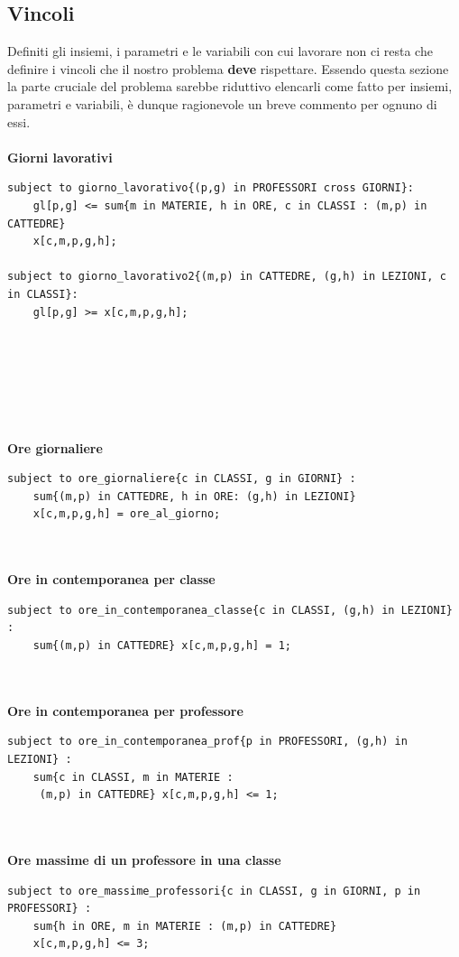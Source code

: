 \documentclass{article}
\begin{document}
\subsection{Vincoli}
Definiti gli insiemi, i parametri e le variabili con cui lavorare non ci resta che definire i vincoli che il nostro problema \textbf{deve} rispettare. Essendo questa sezione la parte cruciale del problema sarebbe riduttivo elencarli come fatto per insiemi, parametri e variabili, è dunque ragionevole un breve commento per ognuno di essi.
\\\\\textbf{Giorni lavorativi}
\begin{verbatim}
subject to giorno_lavorativo{(p,g) in PROFESSORI cross GIORNI}:
	gl[p,g] <= sum{m in MATERIE, h in ORE, c in CLASSI : (m,p) in CATTEDRE}
	x[c,m,p,g,h];

subject to giorno_lavorativo2{(m,p) in CATTEDRE, (g,h) in LEZIONI, c in CLASSI}:
	gl[p,g] >= x[c,m,p,g,h]; 
\end{verbatim}
\\\\\\\\\\\\\textbf{Ore giornaliere}
\begin{verbatim}
subject to ore_giornaliere{c in CLASSI, g in GIORNI} : 
	sum{(m,p) in CATTEDRE, h in ORE: (g,h) in LEZIONI}
	x[c,m,p,g,h] = ore_al_giorno;
\end{verbatim}
\\\\\textbf{Ore in contemporanea per classe}
\begin{verbatim}
subject to ore_in_contemporanea_classe{c in CLASSI, (g,h) in LEZIONI} :
	sum{(m,p) in CATTEDRE} x[c,m,p,g,h] = 1;
\end{verbatim}
\\\\\textbf{Ore in contemporanea per professore}
\begin{verbatim}
subject to ore_in_contemporanea_prof{p in PROFESSORI, (g,h) in LEZIONI} :
	sum{c in CLASSI, m in MATERIE : 
	 (m,p) in CATTEDRE} x[c,m,p,g,h] <= 1;
\end{verbatim}
\\\\\textbf{Ore massime di un professore in una classe}
\begin{verbatim}
subject to ore_massime_professori{c in CLASSI, g in GIORNI, p in PROFESSORI} :
	sum{h in ORE, m in MATERIE : (m,p) in CATTEDRE}
	x[c,m,p,g,h] <= 3;
\end{verbatim}
\end{document}
